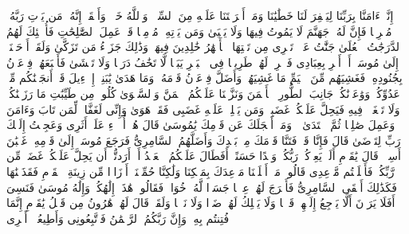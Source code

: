 \stopbuffer
\startbuffer[\q:20:73]
إِنَّاۤ ءَامَنَّا بِرَبِّنَا لِیَغۡفِرَ لَنَا خَطَٰیَٰنَا وَمَاۤ أَكۡرَهۡتَنَا عَلَیۡهِ مِنَ ٱلسِّحۡرِۗ وَٱللَّهُ خَیۡرࣱ وَأَبۡقَىٰۤ%
\stopbuffer
\startbuffer[\q:20:74]
إِنَّهُۥ مَن یَأۡتِ رَبَّهُۥ مُجۡرِمࣰا فَإِنَّ لَهُۥ جَهَنَّمَ لَا یَمُوتُ فِیهَا وَلَا یَحۡیَىٰ%
\stopbuffer
\startbuffer[\q:20:75]
وَمَن یَأۡتِهِۦ مُؤۡمِنࣰا قَدۡ عَمِلَ ٱلصَّٰلِحَٰتِ فَأُو۟لَٰۤئِكَ لَهُمُ ٱلدَّرَجَٰتُ ٱلۡعُلَىٰ%
\stopbuffer
\startbuffer[\q:20:76]
جَنَّٰتُ عَدۡنࣲ تَجۡرِی مِن تَحۡتِهَا ٱلۡأَنۡهَٰرُ خَٰلِدِینَ فِیهَاۚ وَذَٰلِكَ جَزَاۤءُ مَن تَزَكَّىٰ%
\stopbuffer
\startbuffer[\q:20:77]
وَلَقَدۡ أَوۡحَیۡنَاۤ إِلَىٰ مُوسَىٰۤ أَنۡ أَسۡرِ بِعِبَادِی فَٱضۡرِبۡ لَهُمۡ طَرِیقࣰا فِی ٱلۡبَحۡرِ یَبَسࣰا لَّا تَخَٰفُ دَرَكࣰا وَلَا تَخۡشَىٰ%
\stopbuffer
\startbuffer[\q:20:78]
فَأَتۡبَعَهُمۡ فِرۡعَوۡنُ بِجُنُودِهِۦ فَغَشِیَهُم مِّنَ ٱلۡیَمِّ مَا غَشِیَهُمۡ%
\stopbuffer
\startbuffer[\q:20:79]
وَأَضَلَّ فِرۡعَوۡنُ قَوۡمَهُۥ وَمَا هَدَىٰ%
\stopbuffer
\startbuffer[\q:20:80]
یَٰبَنِیۤ إِسۡرَٰۤءِیلَ قَدۡ أَنجَیۡنَٰكُم مِّنۡ عَدُوِّكُمۡ وَوَٰعَدۡنَٰكُمۡ جَانِبَ ٱلطُّورِ ٱلۡأَیۡمَنَ وَنَزَّلۡنَا عَلَیۡكُمُ ٱلۡمَنَّ وَٱلسَّلۡوَىٰ%
\stopbuffer
\startbuffer[\q:20:81]
كُلُوا۟ مِن طَیِّبَٰتِ مَا رَزَقۡنَٰكُمۡ وَلَا تَطۡغَوۡا۟ فِیهِ فَیَحِلَّ عَلَیۡكُمۡ غَضَبِیۖ وَمَن یَحۡلِلۡ عَلَیۡهِ غَضَبِی فَقَدۡ هَوَىٰ%
\stopbuffer
\startbuffer[\q:20:82]
وَإِنِّی لَغَفَّارࣱ لِّمَن تَابَ وَءَامَنَ وَعَمِلَ صَٰلِحࣰا ثُمَّ ٱهۡتَدَىٰ%
\stopbuffer
\startbuffer[\q:20:83]
۞ وَمَاۤ أَعۡجَلَكَ عَن قَوۡمِكَ یَٰمُوسَىٰ%
\stopbuffer
\startbuffer[\q:20:84]
قَالَ هُمۡ أُو۟لَاۤءِ عَلَىٰۤ أَثَرِی وَعَجِلۡتُ إِلَیۡكَ رَبِّ لِتَرۡضَىٰ%
\stopbuffer
\startbuffer[\q:20:85]
قَالَ فَإِنَّا قَدۡ فَتَنَّا قَوۡمَكَ مِنۢ بَعۡدِكَ وَأَضَلَّهُمُ ٱلسَّامِرِیُّ%
\stopbuffer
\startbuffer[\q:20:86]
فَرَجَعَ مُوسَىٰۤ إِلَىٰ قَوۡمِهِۦ غَضۡبَٰنَ أَسِفࣰاۚ قَالَ یَٰقَوۡمِ أَلَمۡ یَعِدۡكُمۡ رَبُّكُمۡ وَعۡدًا حَسَنًاۚ أَفَطَالَ عَلَیۡكُمُ ٱلۡعَهۡدُ أَمۡ أَرَدتُّمۡ أَن یَحِلَّ عَلَیۡكُمۡ غَضَبࣱ مِّن رَّبِّكُمۡ فَأَخۡلَفۡتُم مَّوۡعِدِی%
\stopbuffer
\startbuffer[\q:20:87]
قَالُوا۟ مَاۤ أَخۡلَفۡنَا مَوۡعِدَكَ بِمَلۡكِنَا وَلَٰكِنَّا حُمِّلۡنَاۤ أَوۡزَارࣰا مِّن زِینَةِ ٱلۡقَوۡمِ فَقَذَفۡنَٰهَا فَكَذَٰلِكَ أَلۡقَى ٱلسَّامِرِیُّ%
\stopbuffer
\startbuffer[\q:20:88]
فَأَخۡرَجَ لَهُمۡ عِجۡلࣰا جَسَدࣰا لَّهُۥ خُوَارࣱ فَقَالُوا۟ هَٰذَاۤ إِلَٰهُكُمۡ وَإِلَٰهُ مُوسَىٰ فَنَسِیَ%
\stopbuffer
\startbuffer[\q:20:89]
أَفَلَا یَرَوۡنَ أَلَّا یَرۡجِعُ إِلَیۡهِمۡ قَوۡلࣰا وَلَا یَمۡلِكُ لَهُمۡ ضَرࣰّا وَلَا نَفۡعࣰا%
\stopbuffer
\startbuffer[\q:20:90]
وَلَقَدۡ قَالَ لَهُمۡ هَٰرُونُ مِن قَبۡلُ یَٰقَوۡمِ إِنَّمَا فُتِنتُم بِهِۦۖ وَإِنَّ رَبَّكُمُ ٱلرَّحۡمَٰنُ فَٱتَّبِعُونِی وَأَطِیعُوۤا۟ أَمۡرِی%
